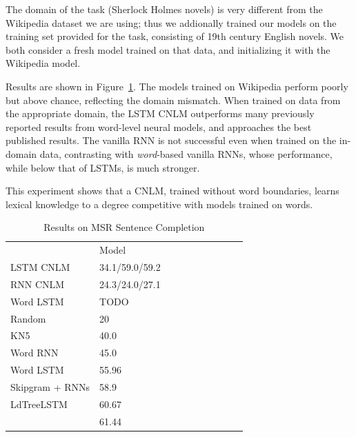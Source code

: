 The domain of the task (Sherlock Holmes novels) is very different from the Wikipedia dataset we are using; thus we addionally trained our models on the training set provided for the task, consisting of 19th century English novels.
We both consider a fresh model trained on that data, and initializing it with the Wikipedia model.

Results are shown in Figure~\ref{tab:msr-completion-results}.
The models trained on Wikipedia perform poorly but above chance, reflecting the domain mismatch.
When trained on data from the appropriate domain, the LSTM CNLM outperforms many previously reported results from word-level neural models, and approaches the best published results.
The vanilla RNN is not successful even when trained on the in-domain data, contrasting with \emph{word}-based vanilla RNNs, whose performance, while below that of LSTMs, is much stronger.

This experiment shows that a CNLM, trained without word boundaries, learns lexical knowledge to a degree competitive with models trained on words.

\begin{table}[t]
  \begin{center}
    \begin{tabular}{l|l|l|l|llllll}
      \multicolumn{1}{c}{}& Model \\
LSTM CNLM	    &      34.1/59.0/59.2 \\
	    RNN CNLM &     24.3/24.0/27.1 \\
	    Word LSTM & TODO \\ \hline
	    Random & 20 \\
	    KN5  \cite{Mikolov:2012} & 40.0 \\
            Word RNN & 45.0 \\
	    Word LSTM \cite{zhang2016top} & 55.96 \\
Skipgram + RNNs \cite{Mikolov:etal:2013b} & 58.9 \\
LdTreeLSTM \cite{zhang2016top} & 60.67 \\
            \cite{woods2016exploiting} &  61.44 \\
    \end{tabular}
  \end{center}
  \caption{\label{tab:msr-completion-results} Results on MSR Sentence Completion}
\end{table}




